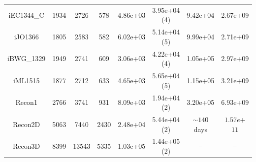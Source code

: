 \documentclass{beamer}
\begin{document}
\begin{frame}
\begin{table}[]
{\begin{tabular}{|c||c|c|c||c|c||c|c|}
               iEC1344\_C  & 1934 & 2726 & 578  & 4.86e+03 & 3.95e+04 (4) & 9.42e+04   & 2.67e+09 \\
               iJO1366  & 1805 & 2583 & 582 & 6.02e+03 & 5.14e+04 (5)  & 9.99e+04  & 2.71e+09 \\
               iBWG\_1329 & 1949 & 2741 & 609 & 3.06e+03 & 4.22e+04 (4) & 1.05e+05   & 2.97e+09 \\
               iML1515 & 1877 & 2712 & 633 &  4.65e+03 & 5.65e+04 (5)  & 1.15e+05   & 3.21e+09 \\
               Recon1 & 2766 & 3741 & 931 & 8.09e+03 & 1.94e+04 (2) & 3.20e+05  & 6.93e+09 \\
               Recon2D & 5063 & 7440 & 2430 & 2.48e+04  &  5.44e+04 (2)  & $\sim 140$ days & $1.57e$+$11$   \\
               Recon3D  & 8399 & 13543 & 5335 & 1.03e+05 &  1.44e+05 (2) & -- & -- \\
               \hline
               \end{tabular}%
         }
      \end{table}

   \end{frame}
\end{document}
